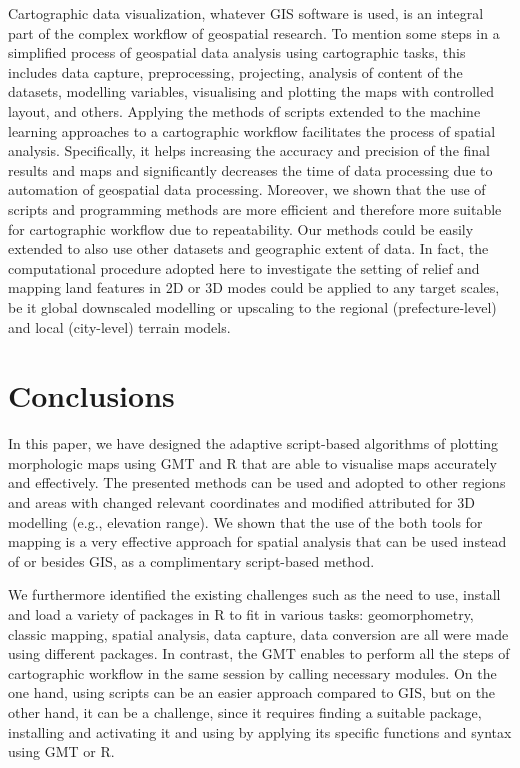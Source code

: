 \documentclass[land,article,submit,pdftex,moreauthors]{Definitions/mdpi}
\begin{document}
Cartographic data visualization, whatever GIS software is used, is an integral part of the complex workflow of geospatial research. To mention some steps in a simplified process of geospatial data analysis using cartographic tasks, this includes data capture, preprocessing, projecting, analysis of content of the datasets, modelling variables, visualising and plotting the maps with controlled layout, and others. Applying the methods of scripts extended to the machine learning approaches to a cartographic workflow facilitates the process of spatial analysis. Specifically, it helps increasing the accuracy and precision of the final results and maps and significantly decreases the time of data processing due to automation of geospatial data processing. Moreover, we shown that the use of scripts and programming methods are more efficient and therefore more suitable for cartographic workflow due to repeatability. Our methods could be easily extended to also use other datasets and geographic extent of data. In fact, the computational procedure adopted here to investigate the setting of relief and mapping land features in 2D or 3D modes could be applied to any target scales, be it global downscaled modelling or upscaling to the regional (prefecture-level) and local (city-level)  terrain models. 


\section{Conclusions}

In this paper, we have designed the adaptive script-based algorithms of plotting morphologic maps using GMT and R that are able to visualise maps accurately and effectively. The presented methods can be used and adopted to other regions and areas with changed relevant coordinates and modified attributed for 3D modelling (e.g., elevation range). We shown that the use of the both tools for mapping is a very effective approach for spatial analysis that can be used instead of or besides GIS, as a complimentary script-based method. 

We furthermore identified the existing challenges such as the need to use, install and load a variety of packages in R to fit in various tasks: geomorphometry, classic mapping, spatial analysis, data capture, data conversion are all were made using different packages. In contrast, the GMT enables to perform all the steps of cartographic workflow in the same session by calling necessary modules. On the one hand, using scripts can be an easier approach  compared to GIS, but on the other hand, it can be a challenge, since it requires finding a suitable package, installing and activating it and using by applying its specific functions and syntax using GMT or R. 
\end{document}
